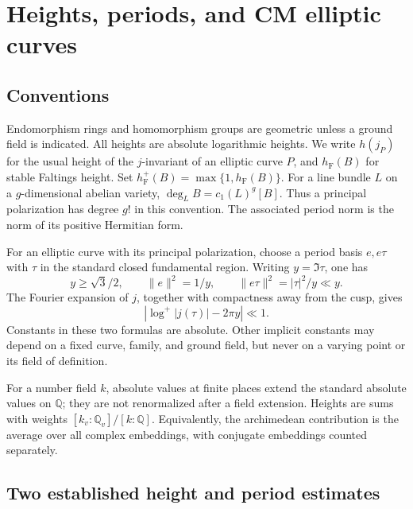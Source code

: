 \documentclass[11pt,a4paper]{article}
\numberwithin{equation}{section}
\theoremstyle{definition}
\theoremstyle{remark}
\newcommand{\Q}{\mathbb Q}
\newcommand{\hF}{h_{\mathrm F}}
\newcommand{\hFp}{h_{\mathrm F}^{+}}
\newcommand{\abs}[1]{\left|#1\right|}
\begin{document}
\section{Heights, periods, and CM elliptic curves}\label{sec:tools}

\subsection{Conventions}

Endomorphism rings and homomorphism groups are geometric unless a
ground field is indicated. All heights are absolute logarithmic heights. We write \(h(j_P)\)
for the usual height of the \(j\)-invariant of an elliptic curve \(P\),
and \(\hF(B)\) for stable Faltings height. Set
\(\hFp(B)=\max\{1,\hF(B)\}\).
For a line bundle \(L\) on a \(g\)-dimensional abelian variety,
\(\deg_L B=c_1(L)^g[B]\). Thus a principal polarization has degree \(g!\)
in this convention. The associated period norm is the norm of its
positive Hermitian form.

For an elliptic curve with its principal polarization, choose a period
basis \(e,e\tau\) with \(\tau\) in the standard closed fundamental region.
Writing \(y=\Im\tau\), one has
\begin{equation}\label{eq:elliptic-norms}
 y\ge\sqrt3/2,\qquad
 \|e\|^2=1/y,\qquad
 \|e\tau\|^2=|\tau|^2/y\ll y.
\end{equation}
The Fourier expansion of \(j\), together with compactness away from
the cusp, gives
\begin{equation}\label{eq:j-y}
 \abs{\log^+|j(\tau)|-2\pi y}\ll1.
\end{equation}
Constants in these two formulas are absolute.
Other implicit constants may depend on a fixed curve, family, and
ground field, but never on a varying point or its field of definition.

For a number field \(k\), absolute values at finite places extend the
standard absolute values on \(\Q\); they are not renormalized after a
field extension. Heights are sums with weights
\([k_v:\Q_v]/[k:\Q]\). Equivalently, the archimedean contribution is
the average over all complex embeddings, with conjugate embeddings
counted separately.

\subsection{Two established height and period estimates}
\end{document}
